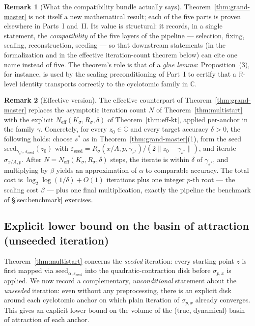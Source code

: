 \documentclass[11pt,a4paper]{article}
\theoremstyle{definition}
\newtheorem{remark}{Remark}[section]
\begin{document}
\begin{remark}[What the compatibility bundle actually says]
Theorem~\ref{thm:grand-master} is not itself a new mathematical result; each of the five parts is proven elsewhere in Parts~I and~II. Its value is structural: it records, in a single statement, the \emph{compatibility} of the five layers of the pipeline --- selection, fixing, scaling, reconstruction, seeding --- so that downstream statements (in the formalization and in the effective iteration-count theorem below) can cite one name instead of five. The theorem's role is that of a \emph{glue lemma}: Proposition~(3), for instance, is used by the scaling preconditioning of Part~I to certify that a $\mathbb{R}$-level identity transports correctly to the cyclotomic family in $\mathbb{C}$.
\end{remark}

\begin{remark}[Effective version]
The effective counterpart of Theorem~\ref{thm:grand-master} replaces the asymptotic iteration count $N$ of Theorem~\ref{thm:multistart} with the explicit $N_{\mathrm{eff}}(K_\sigma, R_\sigma, \delta)$ of Theorem~\ref{thm:eff-kt}, applied per-anchor in the family $\gamma$. Concretely, for every $z_0 \in \mathbb{C}$ and every target accuracy $\delta > 0$, the following holds: choose $s^\ast$ as in Theorem~\ref{thm:grand-master}(1), form the seed $\mathrm{seed}_{\gamma_{s^\ast},\,\varepsilon_{\mathrm{seed}}}(z_0)$ with $\varepsilon_{\mathrm{seed}} = R_\sigma(x/A, p, \gamma_{s^\ast})/(2\|z_0 - \gamma_{s^\ast}\|)$, and iterate $\sigma_{x/A, p}$. After $N = N_{\mathrm{eff}}(K_\sigma, R_\sigma, \delta)$ steps, the iterate is within $\delta$ of $\gamma_{s^\ast}$, and multiplying by $\beta$ yields an approximation of $\alpha$ to comparable accuracy. The total cost is $\log_2 \log(1/\delta) + O(1)$ iterations plus one integer $p$-th root --- the scaling cost $\beta$ --- plus one final multiplication, exactly the pipeline the benchmark of \S\ref{sec:benchmark} exercises.
\end{remark}

\subsection{Explicit lower bound on the basin of attraction (unseeded iteration)}
\label{sec:basin-bound}

Theorem~\ref{thm:multistart} concerns the \emph{seeded} iteration: every starting point $z$ is first mapped via $\mathrm{seed}_{\alpha,\varepsilon_{\mathrm{seed}}}$ into the quadratic-contraction disk before $\sigma_{p,x}$ is applied. We now record a complementary, \emph{unconditional} statement about the \emph{unseeded} iteration: even without any preprocessing, there is an explicit disk around each cyclotomic anchor on which plain iteration of $\sigma_{p,x}$ already converges. This gives an explicit lower bound on the volume of the (true, dynamical) basin of attraction of each anchor.
\end{document}
